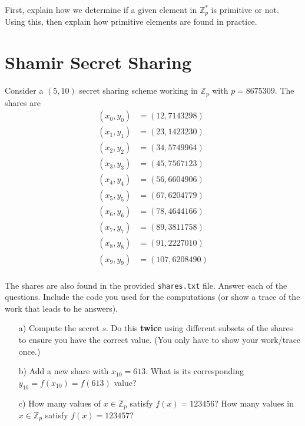 \documentclass[12pt, letterpaper]{article}
\newcommand{\ZZ}{\ensuremath{\mathbb{Z}}}
\newcommand{\code}[1]{\texttt{#1}}
\begin{document}
First, explain how we determine if a given element in $\mathbb{Z}_p^*$ is primitive or not. 
Using this, then explain how primitive elements are found in practice. 


\section{Shamir Secret Sharing}

Consider a $(5,10)$ secret sharing scheme working in $\ZZ_p$ with $p=8675309$.
The shares are 
\begin{align*}
(x_{0}, y_{0}) &= (12, 7143298)\\
(x_{1}, y_{1}) &= (23, 1423230)\\
(x_{2}, y_{2}) &= (34, 5749964)\\
(x_{3}, y_{3}) &= (45, 7567123)\\
(x_{4}, y_{4}) &= (56, 6604906)\\
(x_{5}, y_{5}) &= (67, 6204779)\\
(x_{6}, y_{6}) &= (78, 4644166)\\
(x_{7}, y_{7}) &= (89, 3811758)\\
(x_{8}, y_{8}) &= (91, 2227010)\\
(x_{9}, y_{9}) &= (107, 6208490)\\
\end{align*}

The shares are also found in the provided \code{shares.txt} file.
Answer each of the questions. Include the code you used for the computations (or show a trace of the work
that leads to he answers).

\begin{itemize}
\item[a)] Compute the secret $s$. Do this \textbf{twice} using different subsets of the shares to ensure you have the correct value. (You only have to show your work/trace once.)


\item[b)] Add a new share with $x_{10} = 613$. What is its corresponding $y_{10} = f(x_{10}) = f(613)$ value?



\item[c)] How many values of $x \in \ZZ_p$ satisfy $f(x) = 123456$? How many values in $x \in \ZZ_p$ satisfy $f(x)=123457$?



\end{itemize}






\end{document}
